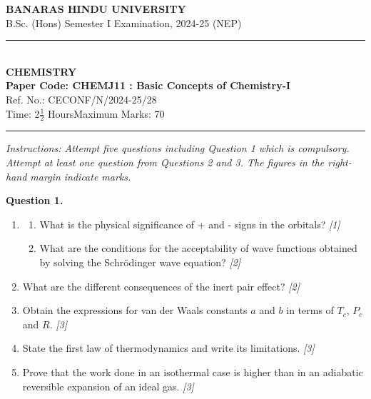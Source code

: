\documentclass[11pt,a4paper]{article}
\newcommand{\pts}[1]{\hfill \textit{[#1]}}
\begin{document}
\begin{center}
  {\large\bfseries BANARAS HINDU UNIVERSITY}\\[2pt]
  {\normalsize B.Sc. (Hons) Semester I Examination, 2024-25 (NEP)}\\[6pt]
  \rule{0.8\linewidth}{0.5pt}\\[6pt]
  {\large\bfseries CHEMISTRY}\\[4pt]
  {\large\bfseries Paper Code: CHEMJ11 : Basic Concepts of Chemistry-I}\\[2pt]
  {\small Ref. No.: CECONF/N/2024-25/28}\\[4pt]
  {\normalsize Time: 2$\frac{1}{2}$ Hours\hfill Maximum Marks: 70}
\end{center}

\rule{\linewidth}{0.4pt}

\smallskip

\noindent \textit{Instructions: Attempt five questions including Question 1 which is compulsory. Attempt at least one question from Questions 2 and 3. The figures in the right-hand margin indicate marks.}

\bigskip

\noindent \textbf{Question 1.}
\begin{enumerate}[label=(\alph*)]
  \item 
  \begin{enumerate}[label=(\i*)]
    \item What is the physical significance of + and - signs in the orbitals? \pts{1}
    \item What are the conditions for the acceptability of wave functions obtained by solving the Schrödinger wave equation? \pts{2}
  \end{enumerate}
  \item What are the different consequences of the inert pair effect? \pts{2}
  \item Obtain the expressions for van der Waals constants $a$ and $b$ in terms of $T_c$, $P_c$ and $R$. \pts{3}
  \item State the first law of thermodynamics and write its limitations. \pts{3}
  \item Prove that the work done in an isothermal case is higher than in an adiabatic reversible expansion of an ideal gas. \pts{3}
\end{enumerate}

\bigskip
\end{document}
